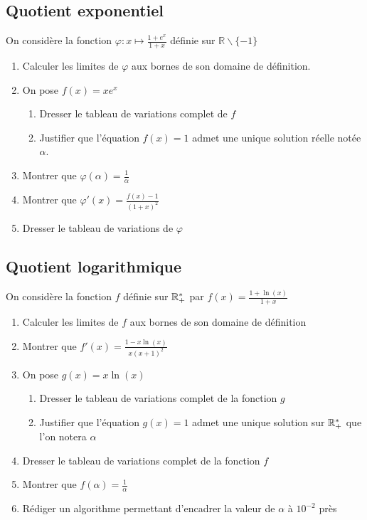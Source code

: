 \documentclass[oneside,12pt]{book}          %
\begin{document}
\subsection{Quotient exponentiel}
On considère la fonction $\varphi : x \mapsto \frac{1 + e^x}{1 + x}$ définie sur $\mathbb{R} \backslash \{-1\}$
\begin{enumerate}
    \item Calculer les limites de $\varphi$ aux bornes de son domaine de définition.
    \item On pose $f(x) = x e^x$
    \begin{enumerate}
        \item Dresser le tableau de variations complet de $f$
        \item Justifier que l'équation $f(x) = 1$ admet une unique solution réelle notée $\alpha$.
    \end{enumerate}
    \item Montrer que $\varphi(\alpha) = \frac{1}{\alpha}$
    \item Montrer que $\varphi'(x) = \frac{f(x) - 1}{(1 + x)^2}$
    \item Dresser le tableau de variations de $\varphi$
\end{enumerate}



\subsection{Quotient logarithmique}
On considère la fonction $f$ définie sur ${\mathbb R}_+^*$ par $f(x)=\frac{1+\ln(x)}{1+x}$
\begin{enumerate}
    \item Calculer les limites de $f$ aux bornes de son domaine de définition
    \item Montrer que $f'(x)=\frac{1-x\ln(x)}{x(x+1)^2}$
    \item On pose $g(x)=x\ln(x)$
    \begin{enumerate}
        \item Dresser le tableau de variations complet de la fonction $g$
        \item Justifier que l'équation $g(x)=1$ admet une unique solution sur ${\mathbb R}^*_+$ que l'on notera $\alpha$
    \end{enumerate}
    \item Dresser le tableau de variations complet de la fonction $f$
    \item Montrer que $f(\alpha)=\frac{1}{\alpha}$
    \item Rédiger un algorithme permettant d'encadrer la valeur de $\alpha$ à $10^{-2}$ près
\end{enumerate}
\end{document}
